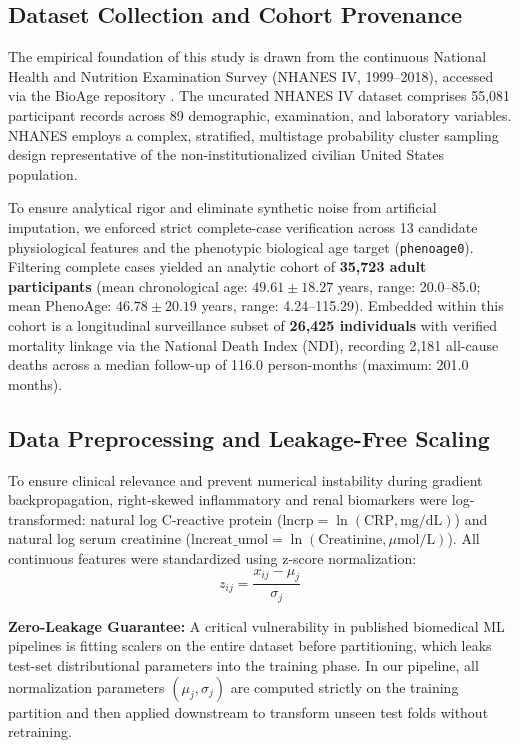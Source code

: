 \documentclass[conference]{IEEEtran}
\begin{document}
\subsection{Dataset Collection and Cohort Provenance}
The empirical foundation of this study is drawn from the continuous National Health and Nutrition Examination Survey (NHANES IV, 1999--2018), accessed via the BioAge repository \cite{kwon2021bioage}. The uncurated NHANES IV dataset comprises 55,081 participant records across 89 demographic, examination, and laboratory variables. NHANES employs a complex, stratified, multistage probability cluster sampling design representative of the non-institutionalized civilian United States population.

To ensure analytical rigor and eliminate synthetic noise from artificial imputation, we enforced strict complete-case verification across 13 candidate physiological features and the phenotypic biological age target (\texttt{phenoage0}). Filtering complete cases yielded an analytic cohort of \textbf{35,723 adult participants} (mean chronological age: $49.61 \pm 18.27$ years, range: 20.0--85.0; mean PhenoAge: $46.78 \pm 20.19$ years, range: 4.24--115.29). Embedded within this cohort is a longitudinal surveillance subset of \textbf{26,425 individuals} with verified mortality linkage via the National Death Index (NDI), recording 2,181 all-cause deaths across a median follow-up of 116.0 person-months (maximum: 201.0 months).

\subsection{Data Preprocessing and Leakage-Free Scaling}
To ensure clinical relevance and prevent numerical instability during gradient backpropagation, right-skewed inflammatory and renal biomarkers were log-transformed: natural log C-reactive protein ($\text{lncrp} = \ln(\text{CRP}, \text{mg/dL})$) and natural log serum creatinine ($\text{lncreat\_umol} = \ln(\text{Creatinine}, \mu\text{mol/L})$). All continuous features were standardized using z-score normalization:
\begin{equation}
z_{ij} = \frac{x_{ij} - \mu_j}{\sigma_j}
\end{equation}

\textbf{Zero-Leakage Guarantee:} A critical vulnerability in published biomedical ML pipelines is fitting scalers on the entire dataset before partitioning, which leaks test-set distributional parameters into the training phase. In our pipeline, all normalization parameters $(\mu_j, \sigma_j)$ are computed strictly on the training partition and then applied downstream to transform unseen test folds without retraining.
\end{document}
